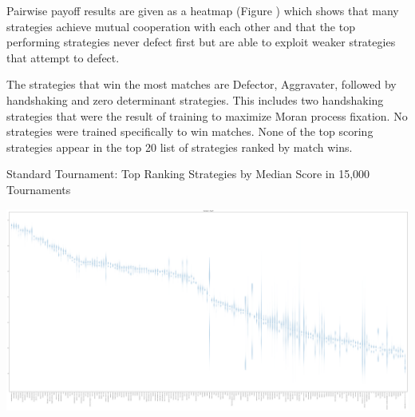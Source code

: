 \documentclass{article}
\begin{document}
Pairwise payoff results are given as a heatmap (Figure ) which
shows that many strategies achieve mutual cooperation with each other and
that the top performing strategies never defect first but are able to exploit
weaker strategies that attempt to defect.

The strategies that win the most matches are Defector, Aggravater, followed by
handshaking and zero determinant strategies. This includes two handshaking
strategies that were the result of training to maximize Moran process fixation.
No strategies were trained specifically to win matches. None of the top scoring
strategies appear in the top 20 list of strategies ranked by match wins.

\begin{table}[!hbtp]
    \centering
        
        \caption{Standard Tournament: Top Ranking Strategies by Median Score in 15,000 Tournaments}
        \label{tbl:standard_score}
\end{table}

\begin{landscape}
    \includegraphics[width=\paperwidth]{plots/Standard_boxplot.pdf}
\end{landscape}
\end{document}
